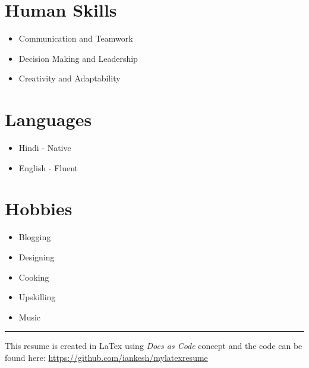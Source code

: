 \documentclass[12pt, a4paper]{article}
\begin{document}
\section*{Human Skills}
\begin{itemize}[noitemsep, nolistsep]
\item Communication and Teamwork
\item Decision Making and Leadership
\item Creativity and Adaptability
\end{itemize}

\section*{Languages}
\begin{itemize}[noitemsep, nolistsep]
\item Hindi - Native
\item English - Fluent
\end{itemize}

\section*{Hobbies}
\begin{itemize}[noitemsep, nolistsep]
\item Blogging
\item Designing
\item Cooking
\item Upskilling
\item Music
\end{itemize}
\begin{center}%
\rule{7.3in}{0.3mm}
\scriptsize This resume is created in LaTex using \textit{Docs as Code} concept and the code can be found here: \footnotesize \url{https://github.com/iankesh/mylatexresume}
\end{center}


\pagebreak
\end{document}
